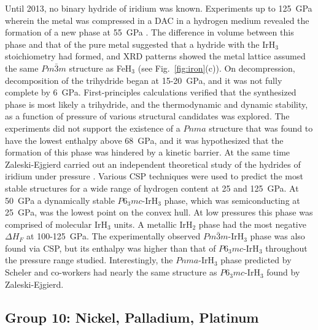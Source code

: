 \documentclass[12pt,letterpaper,oneside]{article}
\begin{document}
Until 2013, no binary hydride of iridium was known. Experiments up to 125~GPa wherein the metal was compressed in a DAC in a hydrogen medium revealed the formation of a new phase at 55~GPa \cite{Scheler:2013c}. The difference in volume between this phase and that of the pure metal suggested that a hydride with the IrH$_3$ stoichiometry had formed, and XRD patterns showed the metal lattice assumed the same $Pm\bar{3}m$ structure as FeH$_3$ (see Fig.\ \ref{fig:iron}(c)). On decompression, decomposition of the trihydride began at 15-20~GPa, and it was not fully complete by 6~GPa. First-principles calculations verified that the synthesized phase is most likely a trihydride, and the thermodynamic and dynamic stability, as a function of pressure of various structural candidates was explored. The experiments did not support the existence of a $Pnma$ structure that was found to have the lowest enthalpy above 68~GPa, and it was hypothesized that the formation of this phase was hindered by a kinetic barrier. At the same time Zaleski-Ejgierd carried out an independent theoretical study of the hydrides of iridium under pressure \cite{Zaleski:2014}. Various CSP techniques were used to predict the most stable structures for a wide range of hydrogen content at 25 and 125~GPa. At 50~GPa a dynamically stable $P6_3mc$-IrH$_3$ phase, which was semiconducting at 25~GPa, was the lowest point on the convex hull. At low pressures this phase was comprised of molecular IrH$_3$ units. A metallic IrH$_2$ phase had the most negative $\Delta H_F$ at 100-125~GPa. The experimentally observed $Pm\bar{3}m$-IrH$_3$ phase was also found via CSP, but its enthalpy was higher than that of $P6_3mc$-IrH$_3$ throughout the pressure range studied. Interestingly, the $Pnma$-IrH$_3$ phase predicted by Scheler and co-workers \cite{Scheler:2013c} had nearly the same structure as $P6_3mc$-IrH$_3$ found by Zaleski-Ejgierd. 


\subsection{Group 10: Nickel, Palladium, Platinum} \label{sec:group10}
\end{document}
